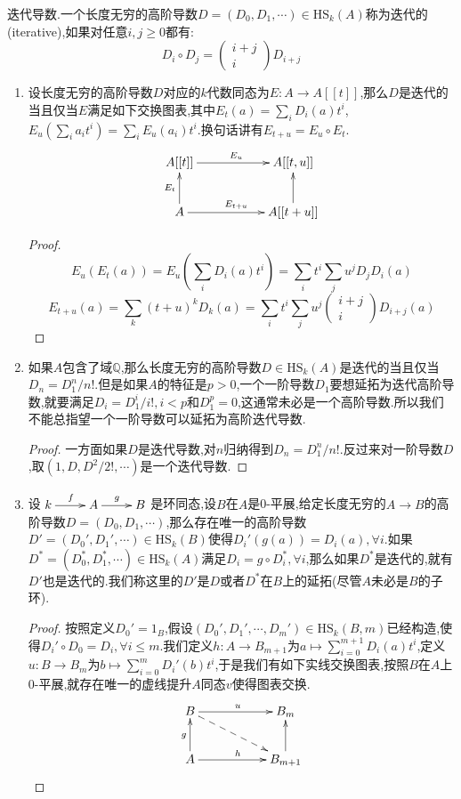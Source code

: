 迭代导数.一个长度无穷的高阶导数$D=(D_0,D_1,\cdots)\in\mathrm{HS}_k(A)$称为迭代的(iterative),如果对任意$i,j\ge0$都有:
$$D_i\circ D_j=\left(\begin{array}{c}i+j\\i\end{array}\right)D_{i+j}$$
\begin{enumerate}
	\item 设长度无穷的高阶导数$D$对应的$k$代数同态为$E:A\to A[[t]]$,那么$D$是迭代的当且仅当$E$满足如下交换图表,其中$E_t(a)=\sum_iD_i(a)t^i$,$E_u(\sum_ia_it^i)=\sum_iE_u(a_i)t^i$.换句话讲有$E_{t+u}=E_u\circ E_t$.
	$$\xymatrix{A[[t]]\ar[rr]^{E_u}&&A[[t,u]]\\A\ar[u]^{E_t}\ar[rr]^{E_{t+u}}&&A[[t+u]]\ar[u]}$$
	\begin{proof}
		$$E_u(E_t(a))=E_u(\sum_iD_i(a)t^i)=\sum_it^i\sum_ju^jD_jD_i(a)$$
		$$E_{t+u}(a)=\sum_k(t+u)^kD_k(a)=\sum_it^i\sum_ju^j\left(\begin{array}{c}i+j\\i\end{array}\right)D_{i+j}(a)$$
	\end{proof}
    \item 如果$A$包含了域$\mathbb{Q}$,那么长度无穷的高阶导数$D\in\mathrm{HS}_k(A)$是迭代的当且仅当$D_n=D_1^n/n!$.但是如果$A$的特征是$p>0$,一个一阶导数$D_1$要想延拓为迭代高阶导数,就要满足$D_i=D_1^i/i!,i<p$和$D_1^p=0$,这通常未必是一个高阶导数.所以我们不能总指望一个一阶导数可以延拓为高阶迭代导数.
    \begin{proof}
    	
    	一方面如果$D$是迭代导数,对$n$归纳得到$D_n=D_1^n/n!$.反过来对一阶导数$D$,取$(1,D,D^2/2!,\cdots)$是一个迭代导数.
    \end{proof}
    \item 设$\xymatrix{k\ar[r]^f&A\ar[r]^g&B}$是环同态,设$B$在$A$是0-平展,给定长度无穷的$A\to B$的高阶导数$D=(D_0,D_1,\cdots)$,那么存在唯一的高阶导数$D'=(D_0',D_1',\cdots)\in\mathrm{HS}_k(B)$使得$D_i'(g(a))=D_i(a),\forall i$.如果$D^*=(D_0^*,D_1^*,\cdots)\in\mathrm{HS}_k(A)$满足$D_i=g\circ D_i^*,\forall i$,那么如果$D^*$是迭代的,就有$D'$也是迭代的.我们称这里的$D'$是$D$或者$D^*$在$B$上的延拓(尽管$A$未必是$B$的子环).
    \begin{proof}
    	
    	按照定义$D_0'=1_B$,假设$(D_0',D_1',\cdots,D_m')\in\mathrm{HS}_k(B,m)$已经构造,使得$D_i'\circ D_0=D_i,\forall i\le m$.我们定义$h:A\to B_{m+1}$为$a\mapsto\sum_{i=0}^{m+1}D_i(a)t^i$,定义$u:B\to B_m$为$b\mapsto\sum_{i=0}^mD_i'(b)t^i$,于是我们有如下实线交换图表,按照$B$在$A$上0-平展,就存在唯一的虚线提升$A$同态$v$使得图表交换.
    	$$\xymatrix{B\ar[rr]^u\ar@{-->}[drr]&&B_m\\A\ar[u]^g\ar[rr]^h&&B_{m+1}\ar[u]}$$
    	

\end{proof}
\end{enumerate}
